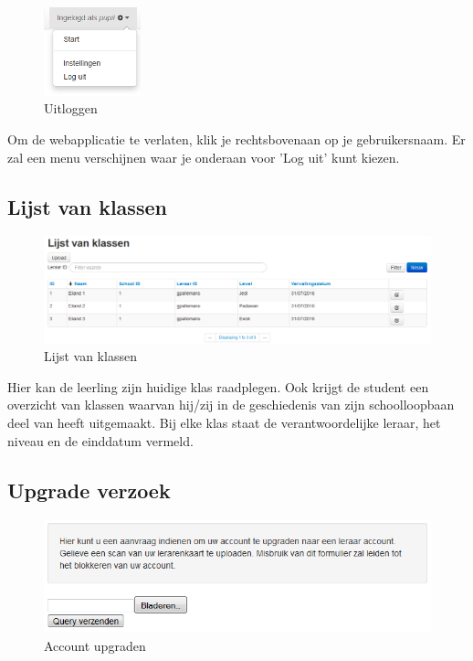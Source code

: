 \documentclass[]{article}
\begin{document}
\begin{figure}[!ht]
	\centering
	\includegraphics[width=0.25\textwidth]{img/logout}
	\caption{Uitloggen}
	\label{logout}
\end{figure} 

Om de webapplicatie te verlaten, klik je rechtsbovenaan op je gebruikersnaam. Er zal een menu verschijnen waar je onderaan voor 'Log uit' kunt kiezen.

\subsection{Lijst van klassen}

\begin{figure}[!ht]
	\centering
	\includegraphics[width=1\textwidth]{img/classes}
	\caption{Lijst van klassen}
	\label{classlist}
\end{figure}

Hier kan de leerling zijn huidige klas raadplegen. Ook krijgt de student een overzicht van klassen waarvan hij/zij in de geschiedenis van zijn schoolloopbaan deel van heeft uitgemaakt. Bij elke klas staat de verantwoordelijke leraar, het niveau en de einddatum vermeld.

\subsection{Upgrade verzoek}

\begin{figure}[!ht]
	\centering
	\includegraphics[width=1\textwidth]{img/upgrade}
	\caption{Account upgraden}
	\label{upgrade}
\end{figure}
\end{document}
